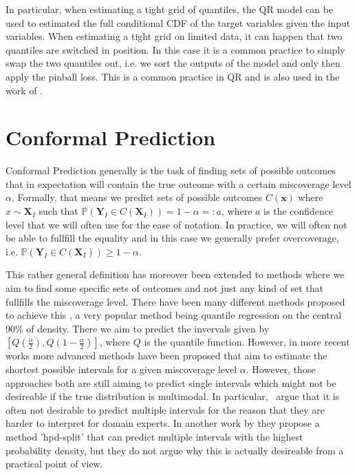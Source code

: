 In particular, when estimating a tight grid of quantiles, the QR model can be used to estimated the full conditional CDF of the target variables given the input variables. When estimating a tight grid on limited data, it can happen that two quantiles are switched in position. In this case it is a common practice to simply swap the two quantiles out, i.e. we sort the outputs of the model and only then apply the pinball loss. This is a common practice in QR and is also used in the work of \cite{sesia2021conformal}.

\section{Conformal Prediction}\label{sec:cp}

Conformal Prediction generally is the task of finding sets of possible outcomes that in expectation will contain the true outcome with a certain miscoverage level $\alpha$. Formally, that means we predict sets of possible outcomes $C(\mathbf{x})$ where $x \sim \mathbf{X}_I$ such that $\mathbb{P}(\mathbf{Y}_I \in C(\mathbf{X}_I)) = 1 - \alpha=:a$, where $a$ is the confidence level that we will often use for the ease of notation. In practice, we will often not be able to fullfill the equality and in this case we generally prefer overcoverage, i.e. $\mathbb{P}(\mathbf{Y}_I \in C(\mathbf{X}_I)) \geq 1 - \alpha$.

This rather general definition has moreover been extended to methods where we aim to find some specific sets of outcomes and not just any kind of set that fullfills the miscoverage level. There have been many different methods proposed to achieve this \cite{sesia2021conformal, chernozhukov2021distributional, balasubramanian2014conformal, shafer2008tutorial}, a very popular method being quantile regression on the central 90\% of density. There we aim to predict the invervals given by $[Q(\frac{\alpha}{2}), Q(1-\frac{\alpha}{2})]$, where $Q$ is the quantile function. However, in more recent works \cite{sesia2021conformal, chernozhukov2021distributional} more advanced methods have been proposed that aim to estimate the shortest possible intervals for a given miscoverage level $\alpha$. However, those approaches both are still aiming to predict single intervals which might not be desireable if the true distribution is multimodal. In particular,~\cite{sesia2021conformal} argue that it is often not desirable to predict multiple intervals for the reason that they are harder to interpret for domain experts. In another work by \cite{izbicki2022cd} they propose a method 'hpd-split' that can predict multiple intervals with the highest probability density, but they do not argue why this is actually desireable from a practical point of view.

